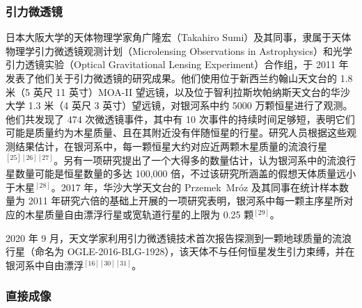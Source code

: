 \subsubsection{引力微透镜}
日本大阪大学的天体物理学家角广隆宏（Takahiro Sumi）及其同事，隶属于天体物理学引力微透镜观测计划（Microlensing Observations in Astrophysics）和光学引力透镜实验（Optical Gravitational Lensing Experiment）合作组，于 2011 年发表了他们关于引力微透镜的研究成果。他们使用位于新西兰约翰山天文台的 1.8 米（5 英尺 11 英寸）MOA-II 望远镜，以及位于智利拉斯坎帕纳斯天文台的华沙大学 1.3 米（4 英尺 3 英寸）望远镜，对银河系中约 5000 万颗恒星进行了观测。他们共发现了 474 次微透镜事件，其中有 10 次事件的持续时间足够短，表明它们可能是质量约为木星质量、且在其附近没有伴随恒星的行星。研究人员根据这些观测结果估计，在银河系中，每一颗恒星大约对应近两颗木星质量的流浪行星$^{[25][26][27]}$。另有一项研究提出了一个大得多的数量估计，认为银河系中的流浪行星数量可能是恒星数量的多达 100{,}000 倍，不过该研究所涵盖的假想天体质量远小于木星$^{[28]}$。2017 年，华沙大学天文台的 Przemek~Mróz 及其同事在统计样本数量为 2011 年研究六倍的基础上开展的一项研究表明，银河系中每一颗主序星所对应的木星质量自由漂浮行星或宽轨道行星的上限为 0.25 颗$^{[29]}$。

2020 年 9 月，天文学家利用引力微透镜技术首次报告探测到一颗地球质量的流浪行星（命名为 OGLE-2016-BLG-1928），该天体不与任何恒星发生引力束缚，并在银河系中自由漂浮$^{[16][30][31]}$。
\subsubsection{直接成像}



